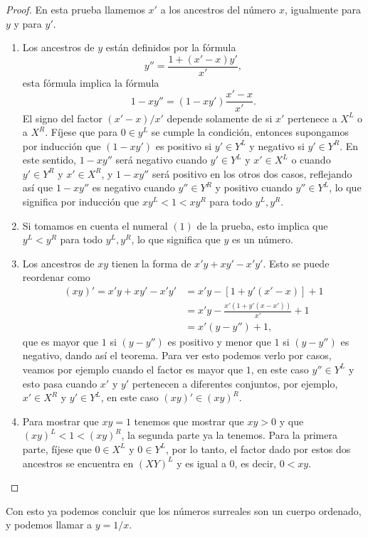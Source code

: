     \begin{proof}
        En esta prueba llamemos $x'$ a los ancestros del n\'umero $x$, igualmente para $y$ y para $y'$.
        \begin{enumerate}
            \item Los ancestros de $y$ est\'an definidos por la f\'ormula
            \[
                y'' = \frac{1+(x'-x)y'}{x'},
            \]
            esta f\'ormula implica la f\'ormula
            \[
                1-xy'' = (1-xy')\frac{x'-x}{x'}.
            \]
            El signo del factor $(x'-x)/x'$ depende solamente de si $x'$ pertenece a $X^L$ o a $X^R$. F\'ijese que para $0\in y^L$ se cumple la condici\'on, entonces supongamos por inducci\'on que $(1-xy')$ es positivo si $y'\in Y^L$ y negativo si $y'\in Y^R$. En este sentido, $1-xy''$ ser\'a negativo cuando $y'\in Y^L$ y $x'\in X^L$ o cuando $y'\in Y^R$ y $x' \in X^R$, y $1-xy''$ ser\'a positivo en los otros dos casos, reflejando as\'i que $1-xy''$ es negativo cuando $y''\in Y^R$ y positivo cuando $y''\in Y^L$, lo que significa por inducci\'on que $xy^L < 1 < xy^R$ para todo $y^L, y^R$.

            \item Si tomamos en cuenta el numeral $(1)$ de la prueba, esto implica que $y^L < y^R$ para todo $y^L, y^R$, lo que significa que $y$ es un n\'umero.
            
            \item Los ancestros de $xy$ tienen la forma de $x'y + xy' - x'y'$. Esto se puede reordenar como 
            \begin{align*}
                (xy)' = x'y + xy' - x'y' & =  x'y -\left[1 + y'(x'-x)\right] + 1 \\
                & = x'y - \frac{x'(1 + y'(x-x'))}{x'} + 1 \\
                & = x'(y - y'') + 1,
            \end{align*}
            que es mayor que $1$ si $(y-y'')$ es positivo y menor que $1$ si $(y-y'')$ es negativo, dando as\'i el teorema. Para ver esto podemos verlo por casos, veamos por ejemplo cuando el factor es mayor que $1$, en este caso $y''\in Y^L$ y esto pasa cuando $x'$ y $y'$ pertenecen a diferentes conjuntos, por ejemplo, $x'\in X^R$ y $y'\in Y^L$, en este caso $(xy)'\in (xy)^R$.

            \item Para mostrar que $xy=1$ tenemos que mostrar que $xy > 0$ y que $(xy)^L < 1 < (xy)^R$, la segunda parte ya la tenemos. Para la primera parte, f\'ijese que $0\in X^L$ y $0\in Y^L$, por lo tanto, el factor dado por estos dos ancestros se encuentra en $(XY)^L$ y es igual a $0$, es decir, $0 < xy$.
        \end{enumerate}
    \end{proof}

    Con esto ya podemos concluir que los n\'umeros surreales son un cuerpo ordenado, y podemos llamar a $y = 1/x$.